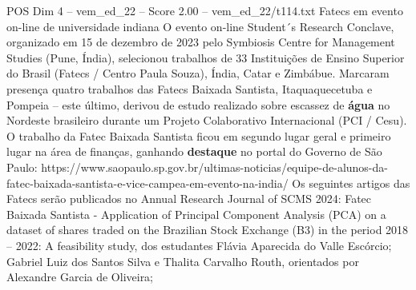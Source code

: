 \begin{textsample}{POS Dim 4 – vem\_ed\_22 – Score 2.00 – vem\_ed\_22/t114.txt}  \label{ex:f4_pos_152}
Fatecs em evento on-line de universidade indiana O evento on-line Student´s Research Conclave, organizado em 15 de dezembro de 2023 pelo Symbiosis Centre for Management Studies (Pune, Índia), selecionou trabalhos de 33 Instituições de Ensino Superior do Brasil (Fatecs / Centro Paula Souza), Índia, Catar e Zimbábue.
Marcaram presença quatro trabalhos das Fatecs Baixada Santista, Itaquaquecetuba e Pompeia – este último, derivou de estudo realizado sobre escassez de \textbf{água} no Nordeste brasileiro durante um Projeto Colaborativo Internacional (PCI / Cesu).
O trabalho da Fatec Baixada Santista ficou em segundo lugar geral e primeiro lugar na área de finanças, ganhando \textbf{destaque} no portal do Governo de São Paulo: https://www.saopaulo.sp.gov.br/ultimas-noticias/equipe-de-alunos-da-fatec-baixada-santista-e-vice-campea-em-evento-na-india/ Os seguintes artigos das Fatecs serão publicados no Annual Research Journal of SCMS 2024: Fatec Baixada Santista - Application of Principal Component Analysis (PCA) on a dataset of shares traded on the Brazilian Stock Exchange (B3) in the period 2018 – 2022: A feasibility study, dos estudantes Flávia Aparecida do Valle Escórcio; Gabriel Luiz dos Santos Silva e Thalita Carvalho Routh, orientados por Alexandre Garcia de Oliveira;

\end{textsample}
